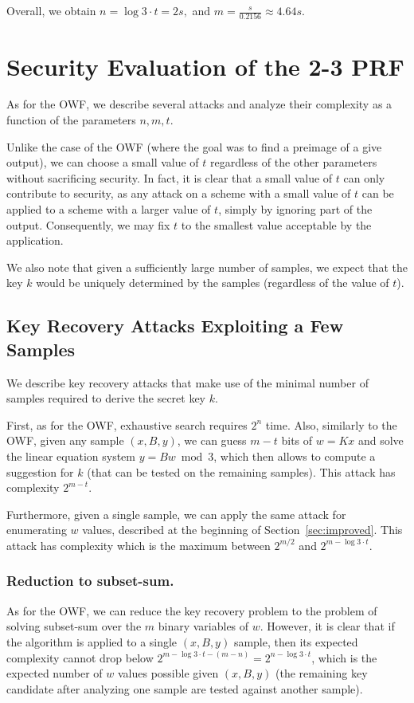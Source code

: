 \documentclass[orivec,envcountsect]{llncs}
\begin{document}
Overall, we obtain
$n = \log 3 \cdot t = 2s,$
and $m = \tfrac{s}{0.2156} \approx 4.64 s.$




\section{Security Evaluation of the 2-3 PRF}
\label{sec:basicprf}

As for the OWF, we describe several attacks and analyze their complexity as a function of the parameters $n,m,t$.

Unlike the case of the OWF (where the goal was to find a preimage of a give output),
we can choose a small value of $t$ regardless of the other parameters without sacrificing security. In fact, it is clear that a small value of $t$ can only contribute to security, as any attack on a scheme with a small value of $t$ can be applied to a scheme with a larger value of $t$, simply by ignoring part of the output. Consequently, we may fix $t$ to the smallest value acceptable by the application.

We also note that given a sufficiently large number of samples, we expect that the key $k$ would be uniquely determined by the samples (regardless of the value of $t$).

\subsection{Key Recovery Attacks Exploiting a Few Samples}
We describe key recovery attacks that make use of the minimal number of samples required to derive the secret key $k$.

First, as for the OWF, exhaustive search requires $2^{n}$ time. Also,
similarly to the OWF, given any sample $(x,B,y)$, we can guess $m - t$ bits of $w = K x$ and solve the linear equation system $y = B w \bmod 3$, which then allows to compute a suggestion for $k$ (that can be tested on the remaining samples). This attack has complexity $2^{m-t}$.

Furthermore, given a single sample, we can apply the same attack for enumerating $w$ values,
described at the beginning of Section~\ref{sec:improved}. This attack has complexity which is the maximum between $2^{m/2}$ and $2^{m - \log 3 \cdot t}$.

\subsubsection{Reduction to subset-sum.}
As for the OWF, we can reduce the key recovery problem to the problem of solving subset-sum over the $m$ binary variables of $w$. However, it is clear that if the algorithm is applied to a single $(x,B,y)$ sample, then its expected complexity cannot drop below $2^{m - \log 3 \cdot t - (m -n)} = 2^{n - \log 3 \cdot t}$, which is the expected number of $w$ values possible given $(x,B,y)$
(the remaining key candidate after analyzing one sample are tested against another sample).
\end{document}
